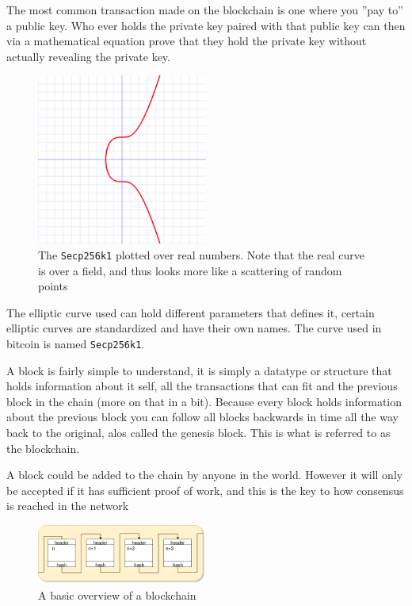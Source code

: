 The most common transaction made on the blockchain is one where you ''pay to'' a public key. Who ever holds the private key paired with that public key can then via a mathematical equation prove that they hold the private key without actually revealing the private key.

\begin{figure}[H]
	\centering
	\includegraphics[width=0.5\textwidth]{introduction/images/Secp256k1.png}
	\caption{The \texttt{Secp256k1} plotted over real numbers. Note that the real curve is over a field, and thus looks more like a scattering of random points}
	\label{fig:eccbasic}
\end{figure}

The elliptic curve used can hold different parameters that defines it, certain elliptic curves are standardized and have their own names. The curve used in bitcoin is named \texttt{Secp256k1}.

A block is fairly simple to understand, it is simply a datatype or structure that holds information about it self, all the transactions that can fit and the previous block in the chain (more on that in a bit). Because every block holds information about the previous block you can follow all blocks backwards in time all the way back to the original, alos called the genesis block. This is what is referred to as the blockchain. 

A block could be added to the chain by anyone in the world. However it will only be accepted if it has sufficient proof of work, and this is the key to how consensus is reached in the network 

\begin{figure}[H]
	\centering
	\includegraphics[width=0.5\textwidth]{introduction/images/blockchain.png}
	\caption{A basic overview of a blockchain}
	\label{fig:blockchain}
\end{figure}

